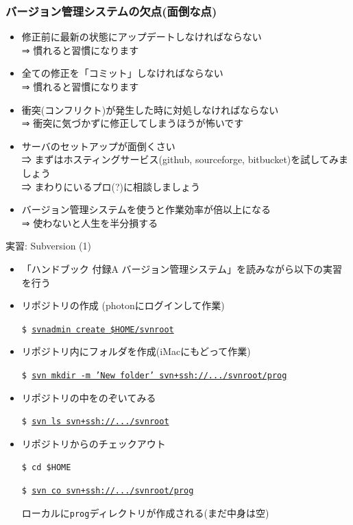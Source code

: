 \begin{frame}
  \frametitle{バージョン管理システムの欠点(面倒な点)}
  \begin{itemize}
  \item 修正前に最新の状態にアップデートしなければならない \\
   ⇒ 慣れると習慣になります
  \item 全ての修正を「コミット」しなければならない \\
    ⇒ 慣れると習慣になります
  \item 衝突(コンフリクト)が発生した時に対処しなければならない \\
    ⇒ 衝突に気づかずに修正してしまうほうが怖いです
  \item サーバのセットアップが面倒くさい \\
    ⇒ まずはホスティングサービス(github, sourceforge, bitbucket)を試してみましょう \\
    ⇒ まわりにいるプロ(?)に相談しましょう \\[.5em]
  \item バージョン管理システムを使うと作業効率が倍以上になる \\
    ⇒ {\color{red} 使わないと人生を半分損する}
  \end{itemize}
\end{frame}

\begin{frame}[t,fragile]{実習: Subversion (1)}
  \begin{itemize}
  \item 「ハンドブック 付録A バージョン管理システム」を読みながら以下の実習を行う
  \item リポジトリの作成 (photonにログインして作業)

    {\tt \$ \underline{svnadmin create \$HOME/svnroot}}
  \item リポジトリ内にフォルダを作成(iMacにもどって作業)

    {\tt \$~\underline{svn mkdir -m 'New folder' svn+ssh://.../svnroot/prog}}
  \item リポジトリの中をのぞいてみる

    {\tt \$ \underline{svn ls svn+ssh://.../svnroot}}

  \item リポジトリからのチェックアウト

    {\tt \$ cd \$HOME}
    
    {\tt \$ \underline{svn co svn+ssh://.../svnroot/prog}}

    ローカルに{\tt prog}ディレクトリが作成される(まだ中身は空)
  \end{itemize}
\end{frame}

